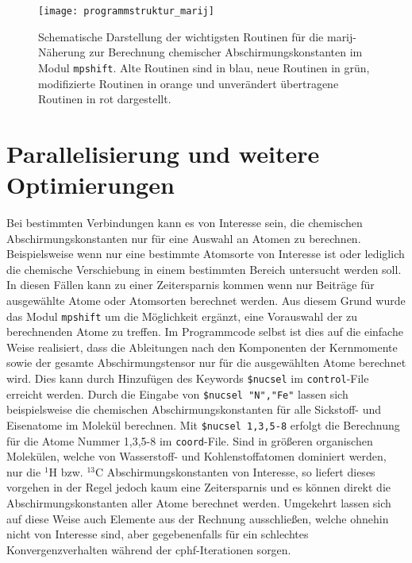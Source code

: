 \begin{figure}[ht!]
\centering
\texttt{[image: programmstruktur\_marij]}
\captionsetup{figurewithin = chapter}
\captionsetup{font=small, labelfont=bf}\caption[\ac{marij}-Routinen für chemische Abschirmungskonstanten]{Schematische Darstellung der wichtigsten Routinen für die \ac{marij}-Näherung zur Berechnung chemischer Abschirmungskonstanten im Modul \texttt{mpshift}. Alte Routinen sind in blau, neue Routinen in grün, modifizierte Routinen in orange und unverändert übertragene Routinen in rot dargestellt.}
\label{abb:programmstrukur_marij}
\end{figure}



\section{Parallelisierung und weitere Optimierungen}\label{paraopt}
Bei bestimmten Verbindungen kann es von Interesse sein, die chemischen Abschirmungskonstanten nur für eine Auswahl an Atomen zu berechnen. Beispielsweise wenn nur eine bestimmte Atomsorte von Interesse ist oder lediglich die chemische Verschiebung in einem bestimmten Bereich untersucht werden soll. In diesen Fällen kann zu einer Zeitersparnis kommen wenn nur Beiträge für ausgewählte Atome oder Atomsorten berechnet werden. Aus diesem Grund wurde das Modul \texttt{mpshift} um die Möglichkeit ergänzt, eine Vorauswahl der zu berechnenden Atome zu treffen. Im Programmcode selbst ist dies auf die einfache Weise realisiert, dass die Ableitungen nach den Komponenten der Kernmomente sowie der gesamte Abschirmungstensor nur für die ausgewählten Atome berechnet wird. Dies kann durch Hinzufügen des Keywords \texttt{\$nucsel} im \texttt{control}-File erreicht werden. Durch die Eingabe von \texttt{\$nucsel "N","Fe"} lassen sich beispielsweise die chemischen Abschirmungskonstanten für alle Sickstoff- und Eisenatome im Molekül berechnen. Mit \texttt{\$nucsel 1,3,5-8} erfolgt die Berechnung für die Atome Nummer 1,3,5-8 im \texttt{coord}-File. Sind in größeren organischen Molekülen, welche von Wasserstoff- und Kohlenstoffatomen dominiert werden, nur die $^1$H bzw. $^{13}$C Abschirmungskonstanten von Interesse, so liefert dieses vorgehen in der Regel jedoch kaum eine Zeitersparnis und es können direkt die Abschirmungskonstanten aller Atome berechnet werden. Umgekehrt lassen sich auf diese Weise auch Elemente aus der Rechnung ausschließen, welche ohnehin nicht von Interesse sind, aber gegebenenfalls für ein schlechtes Konvergenzverhalten während der \ac{cphf}-Iterationen sorgen.

